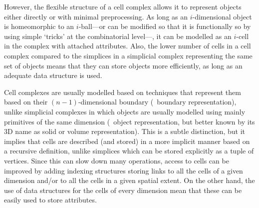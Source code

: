 However, the flexible structure of a cell complex allows it to represent objects either directly or with minimal preprocessing.
As long as an $i$-dimensional object is homeomorphic to an $i$-ball---or can be modified so that it is functionally so by using simple `tricks' at the combinatorial level---, it can be modelled as an $i$-cell in the complex with attached attributes.
Also, the lower number of cells in a cell complex compared to the simplices in a simplicial complex representing the same set of objects means that they can store objects more efficiently, as long as an adequate data structure is used.

Cell complexes are usually modelled based on techniques that represent them based on their $(n-1)$-dimensional boundary (\ie\ boundary representation), unlike simplicial complexes in which objects are usually modelled using mainly primitives of the same dimension (\ie\ object representation, but better known by its 3D name as solid or volume representation).
This is a subtle distinction, but it implies that cells are described (and stored) in a more implicit manner based on a recursive definition, unlike simplices which can be stored explicitly as a tuple of vertices.
Since this can slow down many operations, access to cells can be improved by adding indexing structures storing links to all the cells of a given dimension and/or to all the cells in a given spatial extent.
On the other hand, the use of data structures for the cells of every dimension mean that these can be easily used to store attributes.

